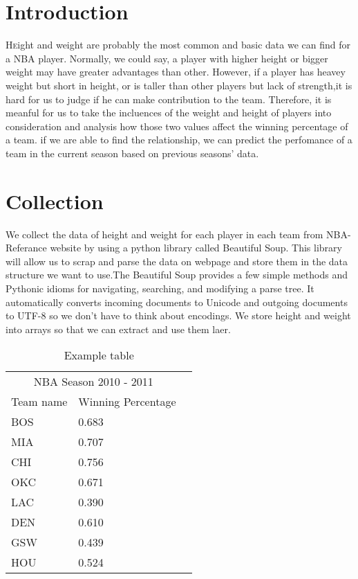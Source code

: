 \documentclass[twoside]{article}
\begin{document}
\begin{multicols}{2} %

\section{Introduction}

\lettrine[nindent=0em,lines=3]{H}eight and weight are probably the most common and basic data we can find for a NBA player. Normally, we could say, a player with higher height or bigger weight may have greater advantages than other. However, if a player has heavey weight but short in height, or is taller than other players but lack of strength,it is hard for us to judge if he can make contribution to the team. Therefore, it is meanful for us to take the incluences of the weight and height of players into consideration and analysis how those two values affect the winning percentage of a team. if we are able to find the relationship, we can predict the perfomance of a team in the current season based on previous seasons' data. 
 


\section{Collection}

We collect the data of height and weight for each player in each team from NBA-Referance website by using a python library called Beautiful Soup. This library will allow us to scrap and parse the data on webpage and store them in the data structure we want to use.The Beautiful Soup provides a few simple methods and Pythonic idioms for navigating, searching, and modifying a parse tree. It automatically converts incoming documents to Unicode and outgoing documents to UTF-8 so we don't have to think about encodings. We store height and weight into arrays so that we can extract and use them laer.


\begin{table}[H]
\caption{Example table}
\centering
\begin{tabular}{llr}
\toprule
\multicolumn{2}{c}{NBA Season 2010 - 2011} \\
\cmidrule(r){1-2}
Team name & Winning Percentage \\
\midrule
BOS & 0.683 &\\
MIA	& 0.707 &\\	
CHI & 0.756 &\\	
OKC & 0.671 &\\	
LAC	& 0.390 &\\
DEN & 0.610 &\\	
GSW	& 0.439 &\\	
HOU & 0.524 &\\	


\end{tabular}
\end{table}
\end{multicols}
\end{document}

